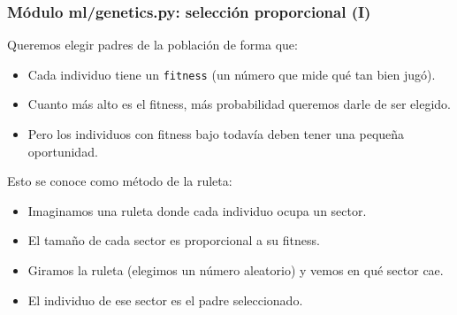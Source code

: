 \documentclass[
	11pt, %
]{beamer}
\begin{document}
\begin{frame}[fragile]
\frametitle{Módulo ml/genetics.py: selección proporcional (I)}

Queremos elegir padres de la población de forma que:

\begin{itemize}
    \item Cada individuo tiene un \texttt{fitness} (un número que mide qué tan bien jugó).
    \item Cuanto más alto es el fitness, más probabilidad queremos darle de ser elegido.
    \item Pero los individuos con fitness bajo todavía deben tener una pequeña oportunidad.
\end{itemize}

Esto se conoce como método de la ruleta:

\begin{itemize}
    \item Imaginamos una ruleta donde cada individuo ocupa un sector.
    \item El tamaño de cada sector es proporcional a su fitness.
    \item Giramos la ruleta (elegimos un número aleatorio) y vemos en qué sector cae.
    \item El individuo de ese sector es el padre seleccionado.
\end{itemize}

\end{frame}

\end{document}
